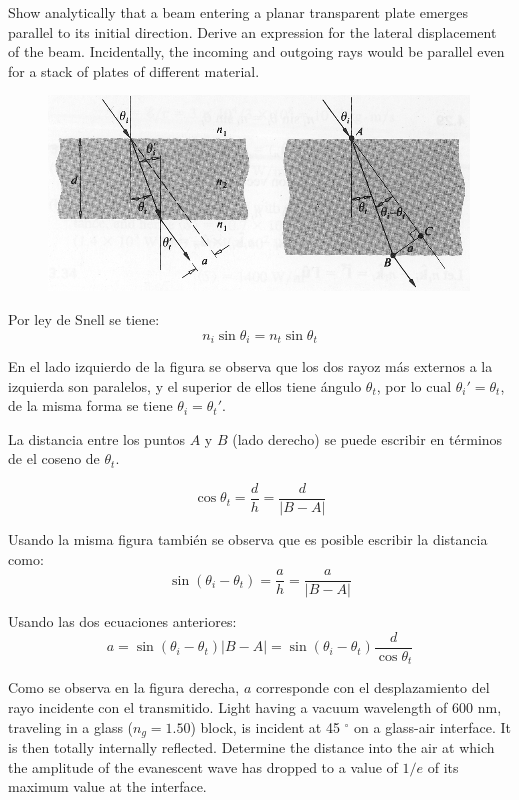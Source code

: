 \documentclass[addpoints,10pt]{exam}
\begin{document}
\begin{questions}
		{
			\question
			Show analytically that a beam entering a planar transparent plate emerges parallel to its initial direction. Derive an expression for the lateral displacement of the beam. Incidentally, the incoming and outgoing rays would be parallel even for a stack of plates of different material.
		}
		
		\begin{figure}[h]
			\centering
			\includegraphics[width = 0.4\linewidth]{demo.png}
		\end{figure}
		
		Por ley de Snell se tiene:
		\begin{equation}
			n_i\sin\theta_i = n_t\sin\theta_t
		\end{equation}
		
		En el lado izquierdo de la figura se observa que los dos rayoz m\'as externos a la izquierda son paralelos, y el superior de ellos tiene \'angulo $\theta_t$, por lo cual $\theta_i' = \theta_t$, de la misma forma se tiene $\theta_i = \theta_t'$.
		
		La distancia entre los puntos $A$ y $B$ (lado derecho) se puede escribir en t\'erminos de el coseno de $\theta_t$.
		
		\begin{equation}
			\cos\theta_t = \dfrac{d}{h} = \dfrac{d}{|B - A|}
		\end{equation}
		
		Usando la misma figura tambi\'en se observa que es posible escribir la distancia como:
		\begin{equation}
			\sin(\theta_i - \theta_t) = \dfrac{a}{h} = \dfrac{a}{|B - A|}
		\end{equation}
		
		Usando las dos ecuaciones anteriores:
		\begin{equation}
			a = \sin(\theta_i - \theta_t)|B - A| = \sin(\theta_i - \theta_t)\dfrac{d}{\cos\theta_t}
		\end{equation}
		
		Como se observa en la figura derecha, $a$ corresponde con el desplazamiento del rayo incidente con el transmitido.
		{
			\question
			Light having a vacuum wavelength of 600 nm, traveling in a glass ($n_g = 1.50$) block, is incident at 45 $^\circ$ on a glass-air interface. It is then totally internally reflected. Determine the distance into the air at which the amplitude of the evanescent wave has dropped to a value of $1/e$ of its maximum value at the interface.
		}
		

\end{questions}
\end{document}
